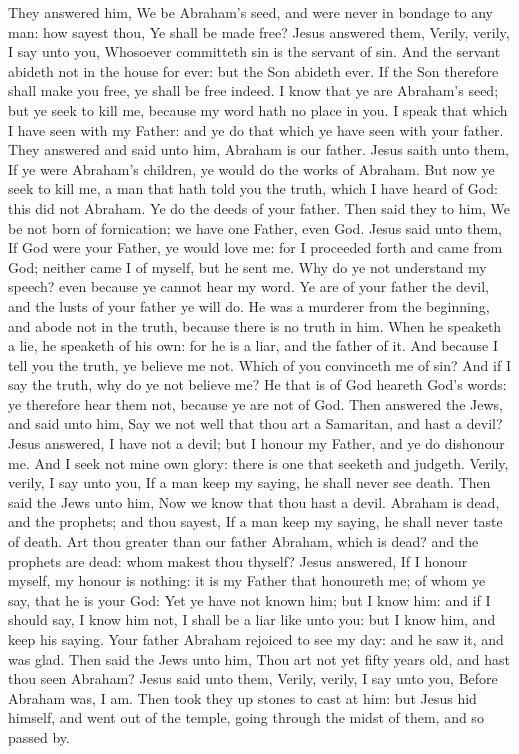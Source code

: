  They answered him, We be Abraham's seed, and were never
in bondage to any man: how sayest thou, Ye shall be made free?
 Jesus answered them, Verily, verily, I say unto you,
Whosoever committeth sin is the servant of sin.  And the
servant abideth not in the house for ever: but the Son abideth ever.
 If the Son therefore shall make you free, ye shall be free
indeed.  I know that ye are Abraham's seed; but ye seek to
kill me, because my word hath no place in you.  I speak
that which I have seen with my Father: and ye do that which ye have seen
with your father.  They answered and said unto him, Abraham
is our father. Jesus saith unto them, If ye were Abraham's children, ye
would do the works of Abraham.  But now ye seek to kill me,
a man that hath told you the truth, which I have heard of God: this did
not Abraham.  Ye do the deeds of your father. Then said
they to him, We be not born of fornication; we have one Father, even
God.  Jesus said unto them, If God were your Father, ye
would love me: for I proceeded forth and came from God; neither came I
of myself, but he sent me.  Why do ye not understand my
speech? even because ye cannot hear my word.  Ye are of
your father the devil, and the lusts of your father ye will do. He was a
murderer from the beginning, and abode not in the truth, because there
is no truth in him. When he speaketh a lie, he speaketh of his own: for
he is a liar, and the father of it.  And because I tell you
the truth, ye believe me not.  Which of you convinceth me
of sin? And if I say the truth, why do ye not believe me? 
He that is of God heareth God's words: ye therefore hear them not,
because ye are not of God.  Then answered the Jews, and
said unto him, Say we not well that thou art a Samaritan, and hast a
devil?  Jesus answered, I have not a devil; but I honour my
Father, and ye do dishonour me.  And I seek not mine own
glory: there is one that seeketh and judgeth.  Verily,
verily, I say unto you, If a man keep my saying, he shall never see
death.  Then said the Jews unto him, Now we know that thou
hast a devil. Abraham is dead, and the prophets; and thou sayest, If a
man keep my saying, he shall never taste of death.  Art
thou greater than our father Abraham, which is dead? and the prophets
are dead: whom makest thou thyself?  Jesus answered, If I
honour myself, my honour is nothing: it is my Father that honoureth me;
of whom ye say, that he is your God:  Yet ye have not known
him; but I know him: and if I should say, I know him not, I shall be a
liar like unto you: but I know him, and keep his saying. 
Your father Abraham rejoiced to see my day: and he saw it, and was glad.
 Then said the Jews unto him, Thou art not yet fifty years
old, and hast thou seen Abraham?  Jesus said unto them,
Verily, verily, I say unto you, Before Abraham was, I am. 
Then took they up stones to cast at him: but Jesus hid himself, and went
out of the temple, going through the midst of them, and so passed by.

